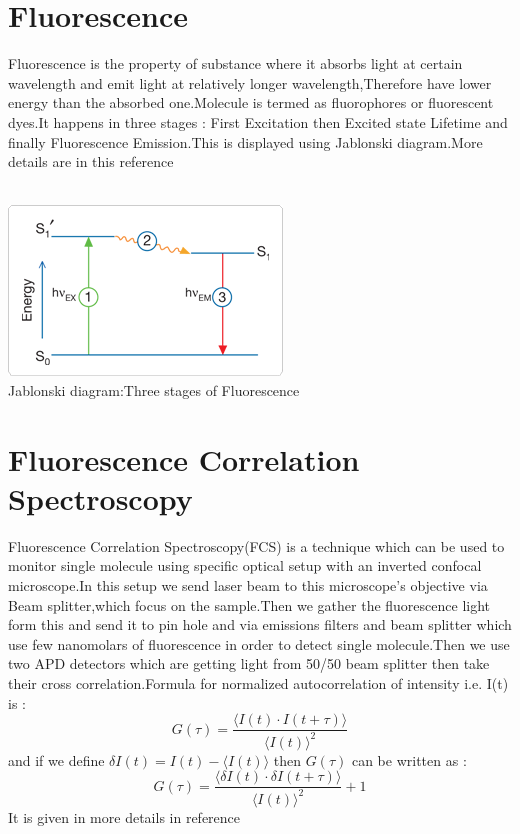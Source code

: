 \documentclass[twoside,single]{lion-msc}
\begin{document}
\section{Fluorescence}
Fluorescence is the property of substance where it absorbs light at certain  wavelength and emit light at relatively longer wavelength,Therefore have lower energy than the absorbed one.Molecule is termed as fluorophores or fluorescent dyes.It happens in three stages : First Excitation then Excited state Lifetime and finally Fluorescence Emission.This is displayed using Jablonski diagram.More details are in this reference \cite{AuNR2} \\
\\
\begin{center}
\includegraphics[scale=1]{2.png}\\
Jablonski diagram:Three stages of Fluorescence \cite{AuNR2} 
\end{center}

\section{Fluorescence Correlation Spectroscopy}
Fluorescence Correlation Spectroscopy(FCS) is a technique which can be used to monitor single molecule using specific optical setup with an inverted confocal microscope.In this setup we send laser beam to this microscope's objective via Beam splitter,which focus on the sample.Then we gather the fluorescence light form this and send it to pin hole and via emissions filters and beam splitter which use few nanomolars of fluorescence in order to detect single molecule.Then we use two APD detectors which are getting light from 50/50 beam splitter then take their cross correlation.Formula for normalized autocorrelation of intensity i.e. I(t) is :
$$
G(\tau) = \frac{\langle{I(t)}\cdot{I(t+\tau)}\rangle}{\langle{I(t)}\rangle^2} 
$$
and if we define $\delta{I(t)} = I(t) - \langle{I(t)}\rangle$ then $G(\tau)$ can be written as :
$$
G(\tau) = \frac{\langle\delta{I(t)}\cdot\delta{I(t+\tau)}\rangle}{\langle{I(t)}\rangle^2} +1
$$
It is given in more details in reference \cite{AuNR3}
\end{document}
